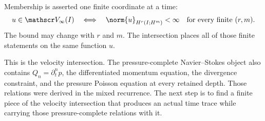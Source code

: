 Membership is asserted one finite coordinate at a time:
\[
  u\in\mathscr V_\infty(I)
  \quad\Longleftrightarrow\quad
  \norm{u}_{H^r(I;H^m)}
  <
  \infty
  \quad
  \text{for every finite }(r,m).
\]
The bound may change with \(r\) and \(m\).
The intersection places all of those finite statements on the same function \(u\).

This is the velocity intersection.
The pressure-complete Navier--Stokes object also contains \(Q_n=\partial_t^np\), the differentiated momentum equation, the divergence constraint, and the pressure Poisson equation at every retained depth.
Those relations were derived in the mixed recurrence.
The next step is to find a finite piece of the velocity intersection that produces an actual time trace while carrying those pressure-complete relations with it.
